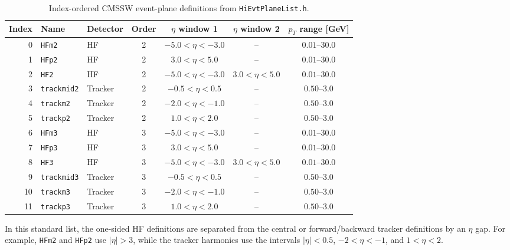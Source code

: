 \documentclass[11pt]{article}
\begin{document}
\begin{table}[h]
\centering
\small
\begin{tabular}{rllcccc}
\toprule
Index & Name & Detector & Order & $\eta$ window 1 & $\eta$ window 2 & $p_{T}$ range [GeV] \\
\midrule
0  & \texttt{HFm2}     & HF      & 2 & $-5.0 < \eta < -3.0$ & --                  & $0.01$--$30.0$ \\
1  & \texttt{HFp2}     & HF      & 2 & $ 3.0 < \eta <  5.0$ & --                  & $0.01$--$30.0$ \\
2  & \texttt{HF2}      & HF      & 2 & $-5.0 < \eta < -3.0$ & $3.0 < \eta < 5.0$ & $0.01$--$30.0$ \\
3  & \texttt{trackmid2}& Tracker & 2 & $-0.5 < \eta <  0.5$ & --                  & $0.50$--$3.0$  \\
4  & \texttt{trackm2}  & Tracker & 2 & $-2.0 < \eta < -1.0$ & --                  & $0.50$--$3.0$  \\
5  & \texttt{trackp2}  & Tracker & 2 & $ 1.0 < \eta <  2.0$ & --                  & $0.50$--$3.0$  \\
6  & \texttt{HFm3}     & HF      & 3 & $-5.0 < \eta < -3.0$ & --                  & $0.01$--$30.0$ \\
7  & \texttt{HFp3}     & HF      & 3 & $ 3.0 < \eta <  5.0$ & --                  & $0.01$--$30.0$ \\
8  & \texttt{HF3}      & HF      & 3 & $-5.0 < \eta < -3.0$ & $3.0 < \eta < 5.0$ & $0.01$--$30.0$ \\
9  & \texttt{trackmid3}& Tracker & 3 & $-0.5 < \eta <  0.5$ & --                  & $0.50$--$3.0$  \\
10 & \texttt{trackm3}  & Tracker & 3 & $-2.0 < \eta < -1.0$ & --                  & $0.50$--$3.0$  \\
11 & \texttt{trackp3}  & Tracker & 3 & $ 1.0 < \eta <  2.0$ & --                  & $0.50$--$3.0$  \\
\bottomrule
\end{tabular}
\caption{Index-ordered CMSSW event-plane definitions from \texttt{HiEvtPlaneList.h}.}
\label{tab:cmssw-eptypes}
\end{table}

\noindent
In this standard list, the one-sided HF definitions are separated from the central or
forward/backward tracker definitions by an $\eta$ gap. For example, \texttt{HFm2} and
\texttt{HFp2} use $|\eta|>3$, while the tracker harmonics use the intervals
$|\eta|<0.5$, $-2<\eta<-1$, and $1<\eta<2$.
\end{document}
